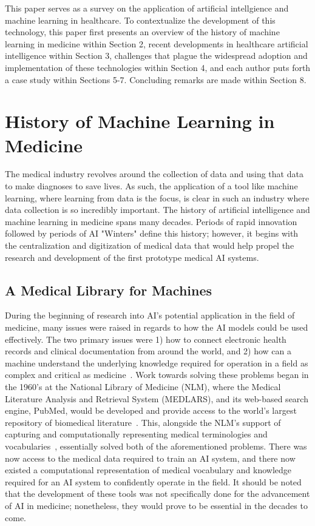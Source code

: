 \documentclass[a4paper]{article}
\begin{document}
This paper serves as a survey on the application of artificial intellgience and machine learning in healthcare. To contextualize the development of this technology, this paper first presents an overview of the history of machine learning in medicine within Section 2, recent developments in healthcare artificial intelligence within Section 3, challenges that plague the widespread adoption and implementation of these technologies within Section 4, and each author puts forth a case study within Sections 5-7. Concluding remarks are made within Section 8.\

\section{History of Machine Learning in Medicine}

The medical industry revolves around the collection of data and using that data to make diagnoses to save lives. As such, the application of a tool like machine learning, where learning from data is the focus, is clear in such an industry where data collection is so incredibly important. The history of artificial intelligence and machine learning in medicine spans many decades. Periods of rapid innovation followed by periods of AI "Winters" define this history; however, it begins with the centralization and digitization of medical data that would help propel the research and development of the first prototype medical AI systems.

\subsection{A Medical Library for Machines}

During the beginning of research into AI's potential application in the field of medicine, many issues were raised in regards to how the AI models could be used effectively. The two primary issues were 1) how to connect electronic health records and clinical documentation from around the world, and 2) how can a machine understand the underlying knowledge required for operation in a field as complex and critical as medicine~\cite{kulikowski_beginnings_2019}. Work towards solving these problems began in the 1960's at the National Library of Medicine (NLM), where the Medical Literature Analysis and Retrieval System (MEDLARS), and its web-based search engine, PubMed, would be developed and provide access to the world's largest repository of biomedical literature~\cite{kulikowski_beginnings_2019}. This, alongside the NLM's support of capturing and computationally representing medical terminologies and vocabularies~\cite{kulikowski_beginnings_2019}, essentially solved both of the aforementioned problems. There was now access to the medical data required to train an AI system, and there now existed a computational representation of medical vocabulary and knowledge required for an AI system to confidently operate in the field. It should be noted that the development of these tools was not specifically done for the advancement of AI in medicine; nonetheless, they would prove to be essential in the decades to come.
\end{document}
